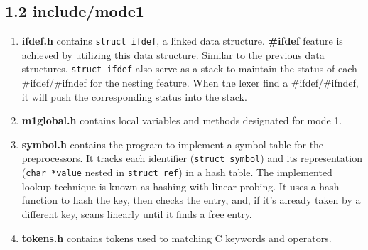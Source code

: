 \subsection*{1.2 \large\textbf{include/mode1}}
\begin{enumerate}
    \item \textbf{ifdef.h} contains \texttt{struct ifdef}, a linked data structure. \textbf{\#ifdef} feature is achieved by utilizing this data structure. Similar to the previous data structures. \texttt{struct ifdef} also serve as a stack to maintain the status of each \#ifdef/\#ifndef for the nesting feature. When the lexer find a \#ifdef/\#ifndef, it will push the corresponding status into the stack. 
    \item \textbf{m1global.h} contains local variables and methods designated for mode 1.
    \item \textbf{symbol.h} contains the program to implement a symbol table for the preprocessors. It tracks each identifier (\texttt{struct symbol}) and its representation (\texttt{char *value} nested in \texttt{struct ref}) in a hash table. The implemented lookup technique is known as hashing with linear probing. It uses a hash function to hash the key, then checks the entry, and, if it’s already taken by a different key, scans linearly until it finds a free entry.
    \item \textbf{tokens.h} contains tokens used to matching C keywords and operators.
\end{enumerate} 